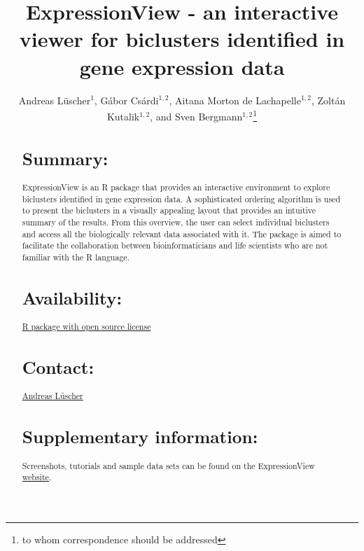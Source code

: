 \documentclass[round]{bioinfo}
\begin{document}
\application{}
\title[ExpressionView]{ExpressionView - an interactive viewer for biclusters identified in gene expression data}
\author[Andreas L\"uscher, G\'abor Cs\'ardi, Aitana Morton de Lachapelle, Zolt\'an Kutalik, and Sven Bergmann]{Andreas L\"uscher$^1$, G\'abor Cs\'ardi$^{1,2}$, Aitana Morton de Lachapelle$^{1,2}$, Zolt\'an Kutalik$^{1,2}$, and Sven Bergmann$^{1,2}$\footnote{to whom correspondence should be addressed}}
\address{
	$^{1}$Swiss Institute of Bioinformatics, Lausanne, Switzerland\\
	$^{2}$Department of Medical Genetics, University of Lausanne, Lausanne, Switzerland
}



\maketitle

\begin{abstract}

\section{Summary:}
ExpressionView is an R package that provides an interactive environment to explore biclusters identified in gene expression data. A sophisticated ordering algorithm is used to present the biclusters in a visually appealing layout that provides an intuitive summary of the results. From this overview, the user can select individual biclusters and access all the biologically relevant data associated with it. The package is aimed to facilitate the collaboration between bioinformaticians and life scientists who are not familiar with the R language.

\section{Availability:} 
\href{http://www.google.com}{R package with open source license}

\section{Contact:} 
\href{andreas.luescher@a3.epfl.ch}{Andreas L\"uscher}

\section{Supplementary information:}
Screenshots, tutorials and sample data sets can be found on the ExpressionView \href{http://maya:7575/ExpressionView}{website}.

\end{abstract}
\end{document}
